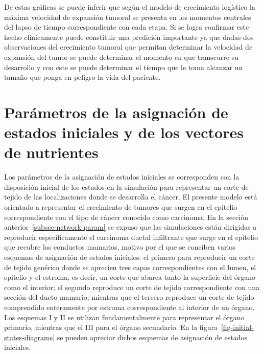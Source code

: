 De estas gr\'aficas se puede inferir que seg\'un el modelo de crecimiento log\'istico la m\'axima velocidad de expansi\'on tumoral se presenta en los momentos centrales del lapso de tiempo correspondiente con cada etapa. Si se logra confirmar este hecho cl\'inicamente puede constituir una predici\'on importante ya que dadas dos observaciones del crecimiento tumoral que permitan determinar la velocidad de expansi\'on del tumor se puede determinar el momento en que transcurre su desarrollo y con este se puede determinar el tiempo que le toma alcanzar un tama\~no que ponga en peligro la vida del paciente.

\section{Par\'ametros de la asignaci\'on de estados iniciales y de los vectores de nutrientes}
\label{subsec-states-param}
Los par\'ametros de la asignaci\'on de estados iniciales se corresponden con la disposici\'on inicial de los estados en la simulaci\'on para representar un corte de tejido de las localizaciones donde se desarrolla el c\'ancer. El presente modelo est\'a orientado a representar el crecimiento de tumores que surgen en el epitelio correspondiente con el tipo de c\'ancer conocido como carcinoma. En la secci\'on anterior~\ref{subsec-network-param} se expuso que las simulaciones est\'an dirigidas a reproducir espec\'ificamente el carcinoma ductal infiltrante que surge en el epitelio que recubre los conductos mamarios, motivo por el que se conciben varios esquemas de asignaci\'on de estados iniciales: el primero para reproducir un corte de tejido gen\'erico donde se aprecien tres capas correspondientes con el lumen, el epitelio y el estroma, es decir, un corte que abarca tanto la superficie del \'organo como el interior; el segundo reproduce un corte de tejido correspondiente con una secci\'on del ducto mamario; mientras que el tercero reproduce un corte de tejido comprendido enteramente por estroma correspondiente al interior de un \'organo. Los esquemas I y II se utilizan fundamentalmente para representar el \'organo primario, mientras que el III para el \'organo secundario. En la figura~\ref{fig-initial-states-diagrams} se pueden apreciar dichos esquemas de asignaci\'on de estados iniciales.

